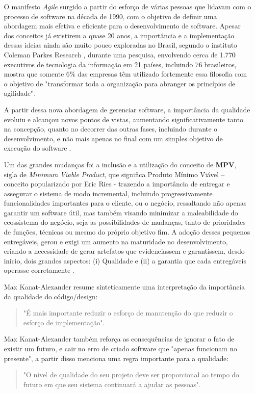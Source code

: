 \documentclass[12pt]{article}
\begin{document}
 O manifesto \textit{Agile} \cite{MANISFESTOAGILE} surgido a partir do esforço de várias pessoas que lidavam com o processo de software na década de 1990, com o objetivo de definir uma abordagem mais efetiva e eficiente para o desenvolvimento de software. Apesar dos conceitos já existirem a quase 20 anos, a importância e a implementação dessas ideias ainda são muito pouco exploradas no Brasil, segundo o instituto Coleman Parkes Research \cite{COLEMANPARKES_AGILE_2017}, durante uma pesquisa, envolvendo cerca de 1.770 executivos de tecnologia da informação em 21 países, incluindo 76 brasileiros, mostra que somente 6\% das empresas têm utilizado fortemente essa filosofia com o objetivo de "transformar toda a organização para abranger os princípios de agilidade".

 A partir dessa nova abordagem de gerenciar software, a importância da qualidade evoluiu e alcançou novos pontos de vistas, aumentando significativamente tanto na concepção, quanto no decorrer das outras fases, incluindo durante o desenvolvimento, e não mais apenas no final com um simples objetivo de execução do software \cite{WATERFALL_MODEL}.
 
 Um das grandes mudanças foi a inclusão e a utilização do conceito de \textbf{MPV}, sigla de \textit{Minimum Viable Product}, que significa Produto Mínimo Viável – conceito popularizado por Eric Ries \cite{ERICRIES_THELEAN} - trazendo a importância de entregar e assegurar o sistema de modo incremental, incluindo progressivamente funcionalidades importantes para o cliente, ou o negócio, ressaltando não apenas garantir um software útil, mas também visando minimizar a maleabilidade do ecossistema do negócio, seja as possibilidades de mudanças, tanto de prioridades de funções, técnicas ou mesmo do próprio objetivo fim. A adoção desses pequenos entregáveis, gerou e exigi um aumento na maturidade no desenvolvimento, criando a necessidade de gerar artefatos que evidenciassem e garantissem, desdo inicio, dois grandes aspectos: (i) Qualidade e (ii) a garantia que cada entregáveis operasse corretamente \cite{AGILE_WORKING_PROCESS}.

Max Kanat-Alexander \cite{CODE_SIMPLICITY} resume sinteticamente uma interpretação da importância da qualidade do código/design: 
\begin{quote}
 "É mais importante reduzir o esforço de manutenção do que reduzir o esforço de implementação".
\end{quote}

Max Kanat-Alexander \cite{CODE_SIMPLICITY} também reforça as consequências de ignorar o fato de existir um futuro, e cair no erro de criado software que "apenas funcionam no presente", a partir disso menciona uma regra importante para a qualidade: 
\begin{quote}
 "O nível de qualidade do seu projeto deve ser proporcional ao tempo do futuro em que seu sistema continuará a ajudar as pessoas".
\end{quote} 
\end{document}

